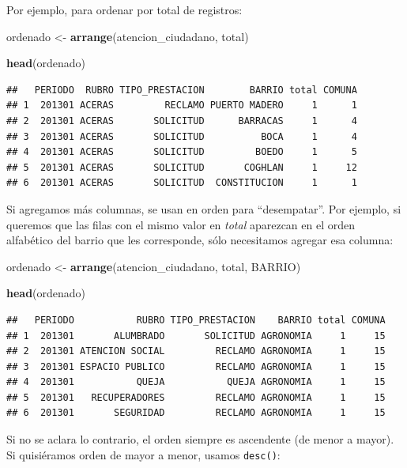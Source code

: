 \documentclass[spanish,]{book}
\newenvironment{Shaded}{\begin{snugshade}}{\end{snugshade}}
\newcommand{\KeywordTok}[1]{\textcolor[rgb]{0.13,0.29,0.53}{\textbf{#1}}}
\newcommand{\NormalTok}[1]{#1}
\newcommand{\StringTok}[1]{\textcolor[rgb]{0.31,0.60,0.02}{#1}}
\begin{document}
Por ejemplo, para ordenar por total de registros:

\begin{Shaded}
\begin{Highlighting}[]
\NormalTok{ordenado <-}\StringTok{ }\KeywordTok{arrange}\NormalTok{(atencion_ciudadano, total)}

\KeywordTok{head}\NormalTok{(ordenado)}
\end{Highlighting}
\end{Shaded}

\begin{verbatim}
##   PERIODO  RUBRO TIPO_PRESTACION        BARRIO total COMUNA
## 1  201301 ACERAS         RECLAMO PUERTO MADERO     1      1
## 2  201301 ACERAS       SOLICITUD      BARRACAS     1      4
## 3  201301 ACERAS       SOLICITUD          BOCA     1      4
## 4  201301 ACERAS       SOLICITUD         BOEDO     1      5
## 5  201301 ACERAS       SOLICITUD       COGHLAN     1     12
## 6  201301 ACERAS       SOLICITUD  CONSTITUCION     1      1
\end{verbatim}

Si agregamos más columnas, se usan en orden para ``desempatar''. Por ejemplo, si queremos que las filas con el mismo valor en \emph{total} aparezcan en el orden alfabético del barrio que les corresponde, sólo necesitamos agregar esa columna:

\begin{Shaded}
\begin{Highlighting}[]
\NormalTok{ordenado <-}\StringTok{ }\KeywordTok{arrange}\NormalTok{(atencion_ciudadano, total, BARRIO)}

\KeywordTok{head}\NormalTok{(ordenado)}
\end{Highlighting}
\end{Shaded}

\begin{verbatim}
##   PERIODO           RUBRO TIPO_PRESTACION    BARRIO total COMUNA
## 1  201301       ALUMBRADO       SOLICITUD AGRONOMIA     1     15
## 2  201301 ATENCION SOCIAL         RECLAMO AGRONOMIA     1     15
## 3  201301 ESPACIO PUBLICO         RECLAMO AGRONOMIA     1     15
## 4  201301           QUEJA           QUEJA AGRONOMIA     1     15
## 5  201301   RECUPERADORES         RECLAMO AGRONOMIA     1     15
## 6  201301       SEGURIDAD         RECLAMO AGRONOMIA     1     15
\end{verbatim}

Si no se aclara lo contrario, el orden siempre es ascendente (de menor a mayor). Si quisiéramos orden de mayor a menor, usamos \texttt{desc()}:
\end{document}
